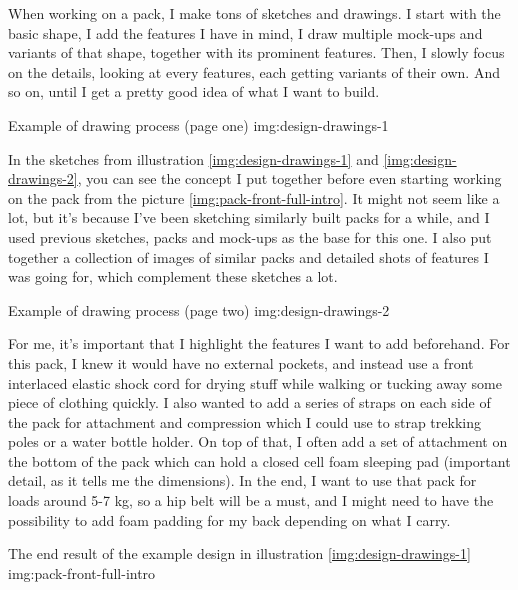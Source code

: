 When working on a pack, I make tons of sketches and drawings. I start with the basic shape, I add the features I have in mind, I draw multiple mock-ups and variants of that shape, together with its prominent features. Then, I slowly focus on the details, looking at every features, each getting variants of their own. And so on, until I get a pretty good idea of what I want to build.

{Example of drawing process (page one)}
{img:design-drawings-1}

In the sketches from illustration \ref{img:design-drawings-1} and \ref{img:design-drawings-2}, you can see the concept I put together before even starting working on the pack from the picture \ref{img:pack-front-full-intro}. It might not seem like a lot, but it's because I've been sketching similarly built packs for a while, and I used previous sketches, packs and mock-ups as the base for this one. I also put together a collection of images of similar packs and detailed shots of features I was going for, which complement these sketches a lot.

{Example of drawing process (page two)}
{img:design-drawings-2}

For me, it's important that I highlight the features I want to add beforehand. For this pack, I knew it would have no external pockets, and instead use a front interlaced elastic shock cord for drying stuff while walking or tucking away some piece of clothing quickly. I also wanted to add a series of straps on each side of the pack for attachment and compression which I could use to strap trekking poles or a water bottle holder. On top of that, I often add a set of attachment on the bottom of the pack which can hold a closed cell foam sleeping pad (important detail, as it tells me the dimensions). In the end, I want to use that pack for loads around 5-7 kg, so a hip belt will be a must, and I might need to have the possibility to add foam padding for my back depending on what I carry.

{The end result of the example design in illustration \ref{img:design-drawings-1}}
{img:pack-front-full-intro}
